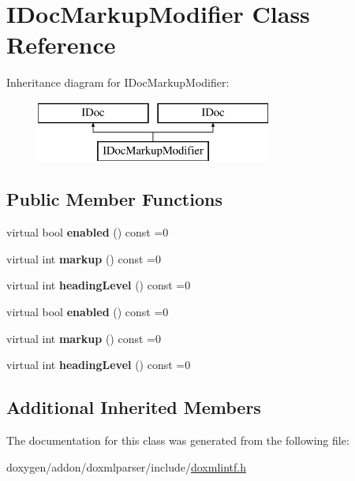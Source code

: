 \hypertarget{class_i_doc_markup_modifier}{}\section{I\+Doc\+Markup\+Modifier Class Reference}
\label{class_i_doc_markup_modifier}
Inheritance diagram for I\+Doc\+Markup\+Modifier\+:\begin{figure}[H]
\begin{center}
\leavevmode
\includegraphics[height=2.000000cm]{class_i_doc_markup_modifier}
\end{center}
\end{figure}
\subsection*{Public Member Functions}
\begin{DoxyCompactItemize}
\item 
\mbox{\label{class_i_doc_markup_modifier_a09fdba81845239bb100c3edaf4ac43f6}} 
virtual bool {\bfseries enabled} () const =0
\item 
\mbox{\label{class_i_doc_markup_modifier_a0619038113bf14d86bbf3e688f577cb5}} 
virtual int {\bfseries markup} () const =0
\item 
\mbox{\label{class_i_doc_markup_modifier_af481bf45a6fdf794d169a33da583b5dd}} 
virtual int {\bfseries heading\+Level} () const =0
\item 
\mbox{\label{class_i_doc_markup_modifier_a09fdba81845239bb100c3edaf4ac43f6}} 
virtual bool {\bfseries enabled} () const =0
\item 
\mbox{\label{class_i_doc_markup_modifier_a0619038113bf14d86bbf3e688f577cb5}} 
virtual int {\bfseries markup} () const =0
\item 
\mbox{\label{class_i_doc_markup_modifier_af481bf45a6fdf794d169a33da583b5dd}} 
virtual int {\bfseries heading\+Level} () const =0
\end{DoxyCompactItemize}
\subsection*{Additional Inherited Members}


The documentation for this class was generated from the following file\+:\begin{DoxyCompactItemize}
\item 
doxygen/addon/doxmlparser/include/\mbox{\hyperlink{include_2doxmlintf_8h}{doxmlintf.\+h}}\end{DoxyCompactItemize}
